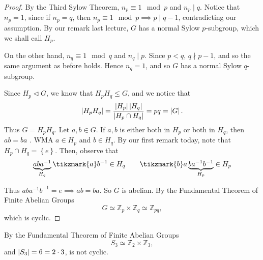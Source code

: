 \documentclass[notoc,notitlepage]{tufte-book}
\begin{document}
\begin{proof}
  By the Third Sylow Theorem, $n_p \equiv 1 \mod p$ and $n_p \mid q$. Notice that $n_p = 1$,
  since if $n_p = q$, then $n_p \equiv 1 \mod p \implies p \mid q - 1$, contradicting our
  assumption. By our remark last lecture, $G$ has a normal Sylow $p$-subgroup, which we shall
  call $H_p$.

  On the other hand, $n_q \equiv 1 \mod q$ and $n_q \mid p$. Since $p < q$, $q \nmid p - 1$,
  and so the same argument as before holds. Hence $n_q = 1$, and so $G$ has a normal Sylow
  $q$-subgroup.

  Since $H_p \triangleleft G$, we know that $H_p H_q \leq G$, and we notice that
  \begin{equation*}
    \left| H_p H_q \right| = \frac{\left| H_p \right| \left| H_q \right|}{\left| H_p \cap H_q \right|} = pq = \left| G \right|.
  \end{equation*}
  Thus $G = H_p H_q$. Let $a, b \in G$. If $a, b$ is either both in $H_p$ or both in $H_q$,
  then $ab = ba$ .
  WMA $a \in H_p$ and $b \in H_q$. By our first remark today, note that 
  $H_p \cap H_q = \left\{ e \right\}$. Then, observe that
  \begin{equation*}
    \underbrace{aba^{-1}}_{H_q} \tikzmark{a}b^{-1} \in H_q 
    \qquad \tikzmark{b}a \underbrace{ba^{-1}b^{-1}}_{H_p} \in H_p
  \end{equation*}
  Thus $aba^{-1}b^{-1} = e \implies ab = ba$. So $G$ is abelian. By the Fundamental Theorem
  of Finite Abelian Groups
  \begin{equation*}
    G \simeq \mathbb{Z}_p \times \mathbb{Z}_q \simeq \mathbb{Z}_{pq},
  \end{equation*}
  which is cyclic.
\end{proof}

\begin{eg}
  By the Fundamental Theorem of Finite Abelian Groups
  \begin{equation*}
    S_3 \simeq \mathbb{Z}_2 \times \mathbb{Z}_3,
  \end{equation*}
  and $\left| S_3 \right| = 6 = 2 \cdot 3$, is not cyclic.
\end{eg}
\end{document}
